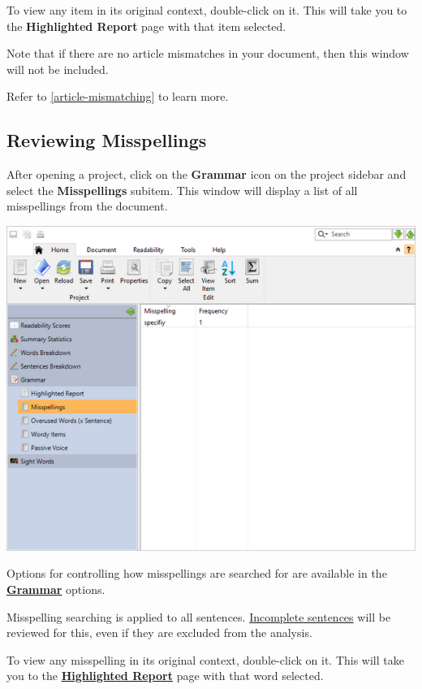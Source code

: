 \documentclass[
]{book}
\theoremstyle{definition}
\theoremstyle{definition}
\theoremstyle{definition}
\theoremstyle{definition}
\theoremstyle{remark}
\begin{document}
To view any item in its original context, double-click on it. This will take you to the \textbf{Highlighted Report} page with that item selected.

Note that if there are no article mismatches in your document, then this window will not be included.

Refer to \ref{article-mismatching} to learn more.

\hypertarget{reviewing-misspellings}{%
\subsection*{Reviewing Misspellings}\label{reviewing-misspellings}}

After opening a project, click on the \textbf{Grammar} icon on the project sidebar and select the \textbf{Misspellings} subitem. This window will display a list of all misspellings from the document.

\includegraphics{Images/misspellings.png}

Options for controlling how misspellings are searched for are available in the \protect\hyperlink{options-grammar}{\textbf{Grammar}} options.

Misspelling searching is applied to all sentences. \protect\hyperlink{how-text-is-excluded}{Incomplete sentences} will be reviewed for this, even if they are excluded from the analysis.

To view any misspelling in its original context, double-click on it. This will take you to the \protect\hyperlink{reviewing-standard-grammar}{\textbf{Highlighted Report}} page with that word selected.
\end{document}
